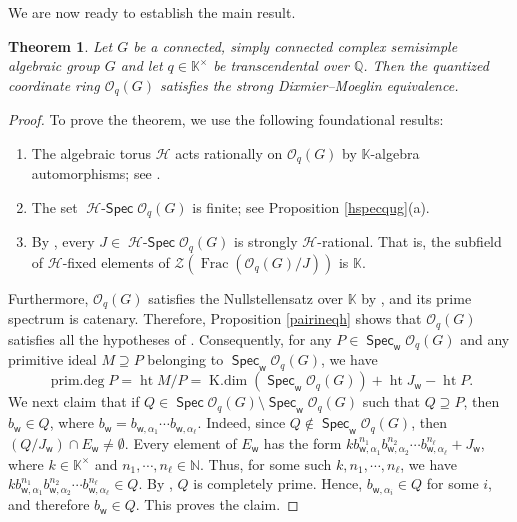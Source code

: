 \documentclass[11pt]{article}
\newtheorem{thm}[equation]{Theorem}
\theoremstyle{definition}
\numberwithin{equation}{section}
\newcommand{\QQ}{\mathbb{Q}}
\newcommand{\NN}{\mathbb{N}}
\newcommand{\KK}{\mathbb{K}}
\newcommand{\qu}{\mathcal{O}}
\newcommand{\cZ}{\mathcal{Z}}
\newcommand{\Hf}{\mathcal{H}} %
\DeclareMathOperator{\kdim}{K.dim}
\DeclareMathOperator{\gfrac}{\mathrm{Frac}}
\DeclareMathOperator{\heit}{\mathrm{ht}}
\DeclareMathOperator{\pdeg}{\mathrm{prim.deg}}
\newcommand\w{\mathsf{w}}
\DeclareMathOperator{\spec}{\mathsf{Spec}}
\DeclareMathOperator{\hspec}{\Hf-\mathsf{Spec}}
\begin{document}
We are now ready to establish the main result.
  	\begin{thm}
  		Let $G$ be a  connected, simply connected complex semisimple algebraic group $G$ and let  $q\in\KK^{\times}$ be transcendental over $\QQ$. Then the quantized coordinate ring $\qu_q(G)$ satisfies the strong Dixmier--Moeglin equivalence. 
  	\end{thm}
  	
  	\begin{proof}
  		To prove the theorem, we use the following foundational results:
  		\begin{enumerate}
  			\item The algebraic torus $\Hf$ acts rationally on $\qu_q(G)$ by $\KK$-algebra automorphisms; see \cite[Exercise II.2.G]{BG02}.
  			\item  The set $\hspec\qu_q(G)$ is finite; see Proposition \ref{hspecqug}(a).
  			\item By \cite[Proposition II.8.3]{BG02}, every $J\in\hspec\qu_q(G)$ is strongly $\Hf$-rational. That is, the subfield of $\Hf$-fixed elements of  $\cZ(\gfrac(\qu_q(G)/J))$ is $\KK$. 
  		\end{enumerate}
  		
Furthermore, $\qu_q(G)$ satisfies the Nullstellensatz over $\KK$ by \cite[Corollary II.7.20]{BG02}, and its prime spectrum is catenary. Therefore, Proposition \ref{pairineqh} shows that  $\qu_q(G)$ satisfies all the hypotheses of \cite[Proposition 5.2]{BLN17}. Consequently, for any $P\in\spec_{\w}\qu_q(G)$ and any primitive ideal  $M\supseteq P$ belonging to $\spec_{\w}\qu_q(G)$, we have
  		\begin{equation}\label{pdegqug}
  			\pdeg P=\heit M/P=  \kdim(\spec_{\w}\qu_q(G))+ \heit J_{\w}- \heit P.
  		\end{equation}
  		We next claim that if $Q\in\spec\qu_q(G)\setminus\spec_{\w}\qu_q(G)$ such that $Q\supseteq P$, then $b_{\w}\in Q$, where $b_{\w}= b_{\w,\alpha_1}\cdots b_{\w,\alpha_{\ell}}$. Indeed, since $Q\notin\spec_{\w}\qu_q(G)$, then  $(Q/J_{\w})\cap E_{\w}\neq\emptyset$. Every element of $E_{\w}$ has the form $kb_{\w,\alpha_1}^{n_1}b_{\w,\alpha_2}^{n_2}\cdots b_{\w,\alpha_{\ell}}^{n_{\ell}}+ J_{\w}$, where $k\in\KK^{\times}$ and $n_1,\cdots,n_{\ell}\in\NN$.  Thus, for some such $k, n_1,\cdots, n_{\ell}$, we have $kb_{\w,\alpha_1}^{n_1}b_{\w,\alpha_2}^{n_2}\cdots b_{\w,\alpha_{\ell}}^{n_{\ell}}\in Q$. By \cite[Théorème 6.4.1(1)]{Ca03}, $Q$ is completely prime. Hence, $b_{\w,\alpha_i}\in Q$ for some $i$, and therefore $b_{\w}\in Q$. This proves the claim. 
 

\end{proof}
\end{document}
